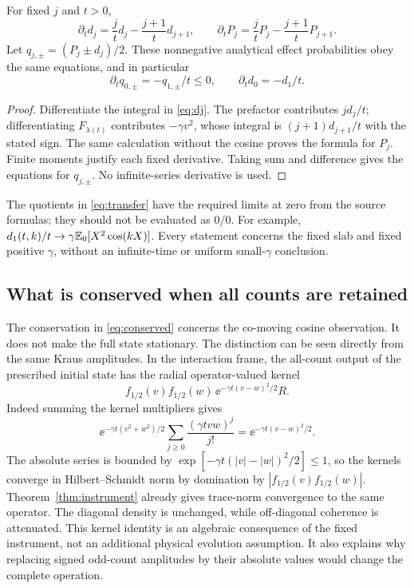 \begin{proposition}\label{prop:transfer}
For fixed $j$ and $t>0$,
\begin{equation}\label{eq:transfer}
 \partial_td_j=\frac jt d_j-\frac{j+1}{t}d_{j+1},\qquad
 \partial_tP_j=\frac jt P_j-\frac{j+1}{t}P_{j+1}.
\end{equation}
Let $q_{j,\pm}=(P_j\pm d_j)/2$. These nonnegative analytical effect
probabilities obey the same equations, and in particular
\begin{equation}\label{eq:loss}
 \partial_tq_{0,\pm}=-q_{1,\pm}/t\le0,\qquad
 \partial_td_0=-d_1/t.
\end{equation}
\end{proposition}
\begin{proof}
Differentiate the integral in \eqref{eq:dj}. The prefactor contributes
$jd_j/t$; differentiating $F_{\lambda(t)}$ contributes $-\gamma v^2$,
whose integral is $(j+1)d_{j+1}/t$ with the stated sign. The same calculation
without the cosine proves the formula for $P_j$. Finite moments justify
each fixed derivative. Taking sum and difference gives the equations for
$q_{j,\pm}$. No infinite-series derivative is used.
\end{proof}

The quotients in \eqref{eq:transfer} have the required limits at zero from
the source formulas; they should not be evaluated as $0/0$. For example,
$d_1(t,k)/t\to\gamma\mathbb E_0[X^2\cos(kX)]$. Every statement concerns the
fixed slab and fixed positive $\gamma$, without an infinite-time or uniform
small-$\gamma$ conclusion.

\subsection{What is conserved when all counts are retained}
The conservation in \eqref{eq:conserved} concerns the co-moving cosine
observation. It does not make the full state stationary. The distinction
can be seen directly from the same Kraus amplitudes. In the interaction
frame, the all-count output of the prescribed initial state has the radial
operator-valued kernel
\begin{equation}\label{eq:dephase}
 f_{1/2}(v)f_{1/2}(w)\,\ee^{-\gamma t(v-w)^2/2}R.
\end{equation}
Indeed summing the kernel multipliers gives
\[
 \ee^{-\gamma t(v^2+w^2)/2}
       \sum_{j\ge0}\frac{(\gamma tvw)^j}{j!}
 =\ee^{-\gamma t(v-w)^2/2}.
\]
The absolute series is bounded by
$\exp[-\gamma t(|v|-|w|)^2/2]\le1$, so the kernels converge in
Hilbert--Schmidt norm by domination by $|f_{1/2}(v)f_{1/2}(w)|$.
Theorem~\ref{thm:instrument} already gives trace-norm convergence to the
same operator. The diagonal density is unchanged, while off-diagonal
coherence is attenuated. This kernel identity is an algebraic consequence
of the fixed instrument, not an additional physical evolution assumption.
It also explains why replacing signed odd-count amplitudes by their
absolute values would change the complete operation.
